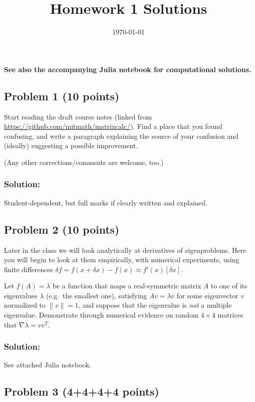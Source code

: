 \documentclass[10pt,oneside]{article}
\author{}
\title{Homework 1 Solutions}
\date{\today}
\begin{document}
\maketitle
\thispagestyle{fancy} 

{\bf See also the accompanying Julia notebook for computational solutions.  }

\subsection*{Problem 1 (10 points)}

Start reading the draft course notes (linked from \url{https://github.com/mitmath/matrixcalc/}).   Find a place that you found confusing, and write a paragraph explaining the source of your confusion and (ideally) suggesting a possible improvement.

(Any other corrections/comments are welcome, too.)

\subsubsection*{Solution:}

Student-dependent, but full marks if clearly written and explained.

\subsection*{Problem 2 (10 points)}

Later in the class we will look analytically at derivatives of eigenproblems.  Here you will begin to look at them empirically, with numerical experiments, using finite differences $\delta f = f(x+\delta x) - f(x) \approx f'(x)[\delta x]$.

    Let $f(A) = \lambda$ be a function that maps a real-symmetric matrix $A$ to one of its eigenvalues $\lambda$ (e.g.~the smallest one), satisfying $Av = \lambda v$ for some eigenvector $v$ normalized to $\| v \| = 1$, and suppose that the eigenvalue is \emph{not} a multiple eigenvalue. Demonstrate through numerical evidence  on random $4 \times 4$ matrices that $ \nabla \lambda = vv^T$.
    
\subsubsection*{Solution:}

See attached Julia notebook.

\subsection*{Problem 3 (4+4+4+4 points)}
\end{document}
